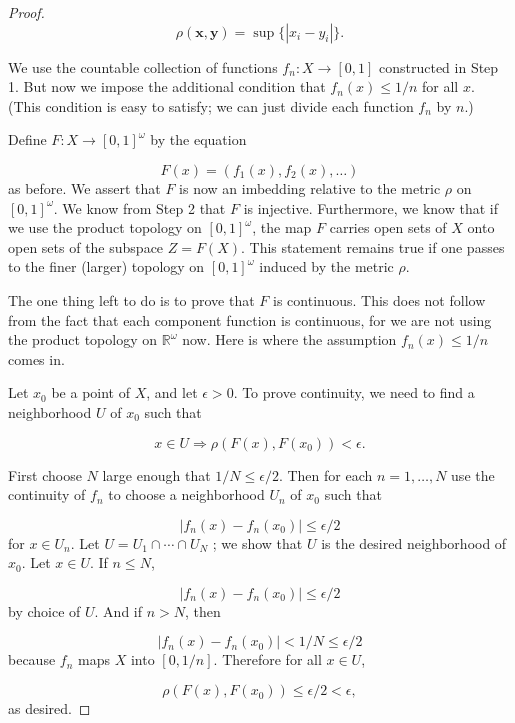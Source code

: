 \begin{proof}
\[
\rho ( {\mathbf{x},\mathbf{y}}) = \sup \{ | {x_{i} - y_{i}}| \}.
\]

We use the countable collection of functions \(f_{n} : X \rightarrow [ {0,1}]\) constructed in Step 1. But now we impose the additional condition that \(f_{n}(x) \leq 1/n\) for all \(x\). (This condition is easy to satisfy; we can just divide each function \(f_{n}\) by \(n\).)

Define \(F : X \rightarrow {[ 0,1] }^{\omega }\) by the equation

\[
F(x) = ( {f_{1}(x),f_{2}(x),\ldots })
\]
as before. We assert that \(F\) is now an imbedding relative to the metric \(\rho\) on \({[ 0,1] }^{\omega }\). We know from Step 2 that \(F\) is injective. Furthermore, we know that if we use the product topology on \({[ 0,1] }^{\omega }\), the map \(F\) carries open sets of \(X\) onto open sets of the subspace \(Z = F( X)\). This statement remains true if one passes to the finer (larger) topology on \({[ 0,1] }^{\omega }\) induced by the metric \(\rho\).

The one thing left to do is to prove that \(F\) is continuous. This does not follow from the fact that each component function is continuous, for we are not using the product topology on \(\mathbb{R}^{\omega }\) now. Here is where the assumption \(f_{n}(x) \leq 1/n\) comes in.

Let \(x_{0}\) be a point of \(X\), and let \(\epsilon > 0\). To prove continuity, we need to find a neighborhood \(U\) of \(x_{0}\) such that

\[
x \in U \Rightarrow \rho ( {F(x),F( x_{0}) }) < \epsilon .
\]

First choose \(N\) large enough that \(1/N \leq \epsilon /2\). Then for each \(n = 1,\ldots, N\) use the continuity of \(f_{n}\) to choose a neighborhood \(U_{n}\) of \(x_{0}\) such that

\[
| {f_{n}(x) - f_{n}( x_{0}) }| \leq \epsilon /2
\]
for \(x \in {U}_{n}\). Let \(U = U_{1} \cap \cdots \cap {U}_{N}\) ; we show that \(U\) is the desired neighborhood of \(x_{0}\). Let \(x \in U\). If \(n \leq N\),

\[
| {f_{n}(x) - f_{n}( x_{0}) }| \leq \epsilon /2
\]
by choice of \(U\). And if \(n > N\), then

\[
| {f_{n}(x) - f_{n}( x_{0}) }| < 1/N \leq \epsilon /2
\]
because \(f_{n}\) maps \(X\) into \([ {0,1/n}]\). Therefore for all \(x \in U\),

\[
\rho ( {F(x),F( x_{0}) }) \leq \epsilon /2 < \epsilon ,
\]
as desired.
\end{proof}

